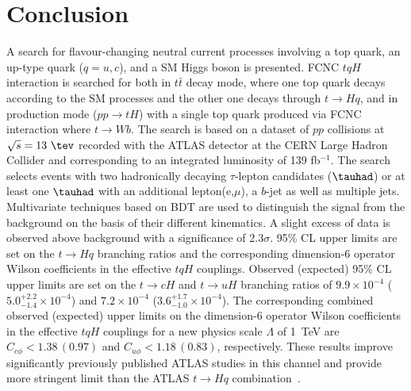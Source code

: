 \section{Conclusion}
\label{sec:conclusion}
A search for flavour-changing neutral current processes involving a top quark, an up-type quark ($q=u, c$), and a SM Higgs boson is presented. FCNC $tqH$ interaction is searched for both in $t\bar{t}$ decay mode, where one top quark decays according to the SM processes and the other one decays through $t\rightarrow Hq$, and in production mode ($pp\rightarrow tH$) with a single top quark produced via FCNC interaction where $t\to Wb$. The search is based on a dataset of $pp$ collisions at $\sqrt{s}=13~\tev$ recorded with the ATLAS detector at the CERN Large Hadron Collider and corresponding to an integrated luminosity of 139 fb$^{-1}$. The search selects events with two hadronically decaying $\tau$-lepton candidates ($\tauhad$) or at least one $\tauhad$ with an additional lepton(e,$\mu$), a $b$-jet as well as multiple jets. Multivariate techniques based on BDT are used to distinguish the signal from the background on the basis of their different kinematics.
A slight excess of data is observed above background with a significance of 2.3$\sigma$.  
95\% CL upper limits are set on the $t\to Hq$ branching ratios and the corresponding
dimension-6 operator Wilson coefficients in the effective $tqH$ couplings. 
Observed (expected) 95\% CL upper limits are set on the $t\to cH$ and $t\to uH$ branching ratios of $9.9\times10^{-4}$ ($5.0^{+2.2}_{-1.4}\times10^{-4}$) and $7.2\times10^{-4}$ ($3.6^{+1.7}_{-1.0}\times10^{-4}$).
The corresponding combined observed (expected) upper limits on the dimension-6 operator Wilson coefficients in
the effective $tqH$ couplings for a new physics scale $\Lambda$ of 1~TeV are $C_{c\phi} <1.38\, (0.97)$ and $C_{u\phi} <1.18\, (0.83)$, respectively.
These results improve significantly previously published ATLAS studies in this channel and provide more stringent limit than the ATLAS  $t\rightarrow Hq$ combination~\cite{fcnc36}.
